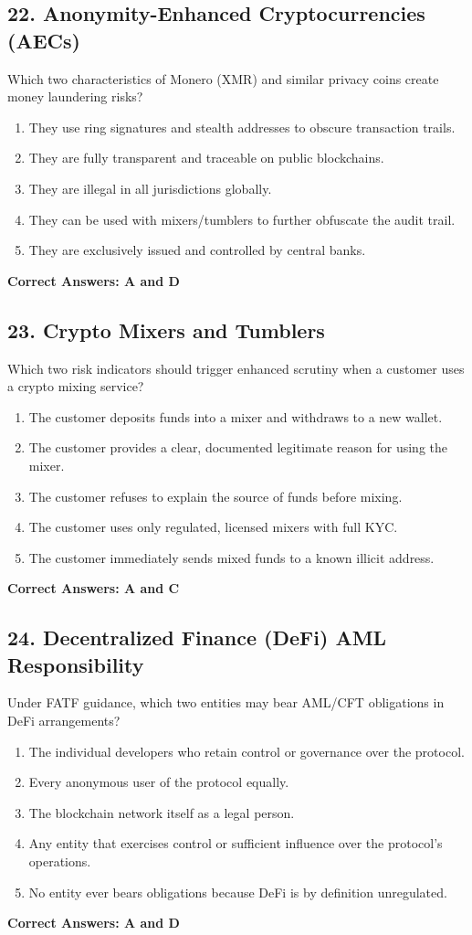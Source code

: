\documentclass[11pt,a4paper]{article}
\begin{document}
	\subsection{22. Anonymity-Enhanced Cryptocurrencies (AECs)}
	Which two characteristics of Monero (XMR) and similar privacy coins create money laundering risks?
	\begin{enumerate}[label=\Alph*.]
		\item They use ring signatures and stealth addresses to obscure transaction trails.
		\item They are fully transparent and traceable on public blockchains.
		\item They are illegal in all jurisdictions globally.
		\item They can be used with mixers/tumblers to further obfuscate the audit trail.
		\item They are exclusively issued and controlled by central banks.
	\end{enumerate}
	\textbf{Correct Answers: A and D}
	
	\subsection{23. Crypto Mixers and Tumblers}
	Which two risk indicators should trigger enhanced scrutiny when a customer uses a crypto mixing service?
	\begin{enumerate}[label=\Alph*.]
		\item The customer deposits funds into a mixer and withdraws to a new wallet.
		\item The customer provides a clear, documented legitimate reason for using the mixer.
		\item The customer refuses to explain the source of funds before mixing.
		\item The customer uses only regulated, licensed mixers with full KYC.
		\item The customer immediately sends mixed funds to a known illicit address.
	\end{enumerate}
	\textbf{Correct Answers: A and C}
	
	\subsection{24. Decentralized Finance (DeFi) AML Responsibility}
	Under FATF guidance, which two entities may bear AML/CFT obligations in DeFi arrangements?
	\begin{enumerate}[label=\Alph*.]
		\item The individual developers who retain control or governance over the protocol.
		\item Every anonymous user of the protocol equally.
		\item The blockchain network itself as a legal person.
		\item Any entity that exercises control or sufficient influence over the protocol's operations.
		\item No entity ever bears obligations because DeFi is by definition unregulated.
	\end{enumerate}
	\textbf{Correct Answers: A and D}
	
\end{document}
